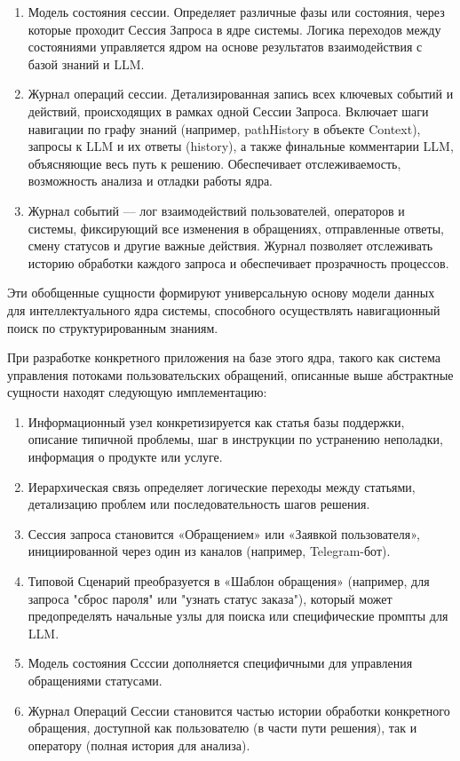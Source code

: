 \begin{enumerate}[label=\arabic*.]
    \item Модель состояния сессии. Определяет различные фазы или состояния, через которые проходит Сессия Запроса в ядре системы. Логика переходов между состояниями управляется ядром на основе результатов взаимодействия с базой знаний и LLM.
    
    \item Журнал операций сессии. Детализированная запись всех ключевых событий и действий, происходящих в рамках одной Сессии Запроса. Включает шаги навигации по графу знаний (например, pathHistory в объекте Context), запросы к LLM и их ответы (history), а также финальные комментарии LLM, объясняющие весь путь к решению. Обеспечивает отслеживаемость, возможность анализа и отладки работы ядра.
    
    \item Журнал событий — лог взаимодействий пользователей, операторов и системы, фиксирующий все изменения в обращениях, отправленные ответы, смену статусов и другие важные действия. Журнал позволяет отслеживать историю обработки каждого запроса и обеспечивает прозрачность процессов.
    
\end{enumerate}

Эти обобщенные сущности формируют универсальную основу модели данных для интеллектуального ядра системы, способного осуществлять навигационный поиск по структурированным знаниям.

При разработке конкретного приложения на базе этого ядра, такого как система управления потоками пользовательских обращений, описанные выше абстрактные сущности находят следующую имплементацию:

\begin{enumerate}[label=\arabic*.]
    \item Информационный узел конкретизируется как статья базы поддержки, описание типичной проблемы, шаг в инструкции по устранению неполадки, информация о продукте или услуге.

    \item Иерархическая связь определяет логические переходы между статьями, детализацию проблем или последовательность шагов решения.
    
    \item Сессия запроса становится «Обращением» или «Заявкой пользователя», инициированной через один из каналов (например, Telegram-бот).

    \item Типовой Сценарий преобразуется в «Шаблон обращения» (например, для запроса "сброс пароля" или "узнать статус заказа"), который может предопределять начальные узлы для поиска или специфические промпты для LLM.

    \item Модель состояния Ссссии дополняется специфичными для управления обращениями статусами.

    \item Журнал Операций Сессии становится частью истории обработки конкретного обращения, доступной как пользователю (в части пути решения), так и оператору (полная история для анализа).
\end{enumerate}


